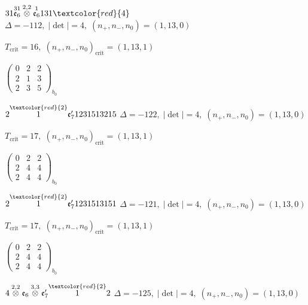 \documentclass[10pt]{article}
\begin{document}
$31\overset{31}{\mathfrak{e}_6}\overset{2,2}{\otimes}\overset{1}{\mathfrak{e}_6}131\textcolor{red}{4}$ \quad $\Delta=-112,\; |\det|=4,\; (n_+,n_-,n_0)=(1,13,0)$

\hspace{1em}$T_{\text{crit}}=16,\; (n_+,n_-,n_0)_{\text{crit}}=(1,13,1)$

\hspace{2em}$\left(\begin{smallmatrix}0 & 2 & 2 \\ 2 & 1 & 3 \\ 2 & 3 & 5\end{smallmatrix}\right)_{\!b_0}$

\smallskip

$2\overset{\textcolor{red}{2}}{1}\mathfrak{e}_7'1231513215$ \quad $\Delta=-122,\; |\det|=4,\; (n_+,n_-,n_0)=(1,13,0)$

\hspace{1em}$T_{\text{crit}}=17,\; (n_+,n_-,n_0)_{\text{crit}}=(1,13,1)$

\hspace{2em}$\left(\begin{smallmatrix}0 & 2 & 2 \\ 2 & 4 & 4 \\ 2 & 4 & 4\end{smallmatrix}\right)_{\!b_0}$

\smallskip

$2\overset{\textcolor{red}{2}}{1}\mathfrak{e}_7'1231513151$ \quad $\Delta=-121,\; |\det|=4,\; (n_+,n_-,n_0)=(1,13,0)$

\hspace{1em}$T_{\text{crit}}=17,\; (n_+,n_-,n_0)_{\text{crit}}=(1,13,1)$

\hspace{2em}$\left(\begin{smallmatrix}0 & 2 & 2 \\ 2 & 4 & 4 \\ 2 & 4 & 4\end{smallmatrix}\right)_{\!b_0}$

\smallskip

$4\overset{2,2}{\otimes}\mathfrak{e}_6\overset{3,3}{\otimes}\mathfrak{e}_7'\overset{\textcolor{red}{2}}{1}2$ \quad $\Delta=-125,\; |\det|=4,\; (n_+,n_-,n_0)=(1,13,0)$
\end{document}
